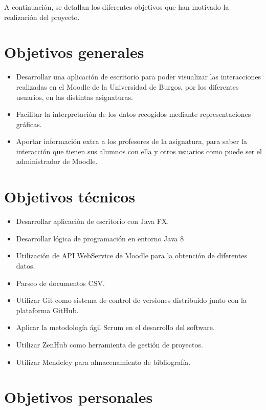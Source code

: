 

A continuación, se detallan los diferentes objetivos que han motivado la
realización del proyecto.

\section{Objetivos generales}\label{objetivos-generales}

\begin{itemize}
	\tightlist
	\item
	Desarrollar una aplicación de escritorio para poder visualizar las interacciones realizadas en el Moodle de la Universidad de Burgos, por los diferentes usuarios, en las distintas asignaturas.
	\item
	Facilitar la interpretación de los datos recogidos mediante
	representaciones gráficas.
	\item
	Aportar información extra a los profesores de la asignatura, para saber la interacción que tienen sus alumnos con ella y otros usuarios como puede ser el administrador de Moodle.
	
\end{itemize}

\section{Objetivos técnicos}\label{objetivos-tecnicos}

\begin{itemize}
	\tightlist
	\item
	Desarrollar aplicación de escritorio con Java FX.
	\item
	Desarrollar lógica de programación en entorno Java 8
	\item
	Utilización de API WebService de Moodle para la obtención de diferentes datos.
	\item
	Parseo de documentos CSV.
	\item
	Utilizar Git como sistema de control de versiones distribuido junto
	con la plataforma GitHub.
	\item
	Aplicar la metodología ágil Scrum en el desarrollo del software.
	\item
	Utilizar ZenHub como herramienta de gestión de proyectos.
	\item
	Utilizar Mendeley para almacenamiento de bibliografía.
\end{itemize}

\section{Objetivos personales}\label{objetivos-personales}

